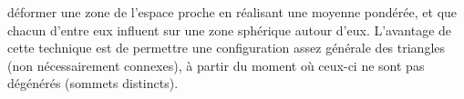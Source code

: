 \begin{itemize}
  déformer une zone de l'espace proche en réalisant une moyenne
  pondérée, et que chacun d'entre eux influent sur une zone sphérique
  autour d'eux. L'avantage de cette technique est de permettre une
  configuration assez générale des triangles (non nécessairement
  connexes), à partir du moment où ceux-ci ne sont pas dégénérés
  (sommets distincts).

\end{itemize}

